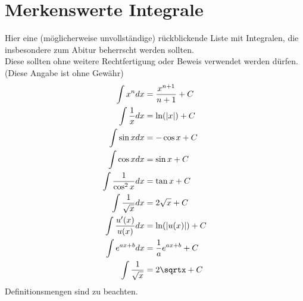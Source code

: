 \section{Merkenswerte Integrale}
Hier eine (möglicherweise unvollständige) rückblickende Liste mit Integralen, die insbesondere zum Abitur beherrscht werden sollten.\\
Diese sollten ohne weitere Rechtfertigung oder Beweis verwendet werden dürfen. (Diese Angabe ist ohne Gewähr)\\
\begin{align*}
  \int x^n dx &=\dfrac{x^{n+1}}{n+1} + C\\
  \int\dfrac{1}{x} dx &= \ln(|x|) + C\\
  \int\sin x dx &= -\cos x + C\\
  \int\cos x dx &= \sin x + C\\
  \int\dfrac{1}{\cos^2x}dx &= \tan x + C\\
  \int\dfrac{1}{\sqrt{x}}dx &= 2\sqrt{x} + C\\
  \int\dfrac{u'(x)}{u(x)} dx &= \ln(|u(x)|) + C\\
  \int e^{ax+b}dx &= \dfrac{1}{a}e^{ax+b} + C\\
  \int \dfrac{1}{\sqrt x} &= 2\sqrtx + C\\
\end{align*}
\danger Definitionsmengen sind zu beachten.
